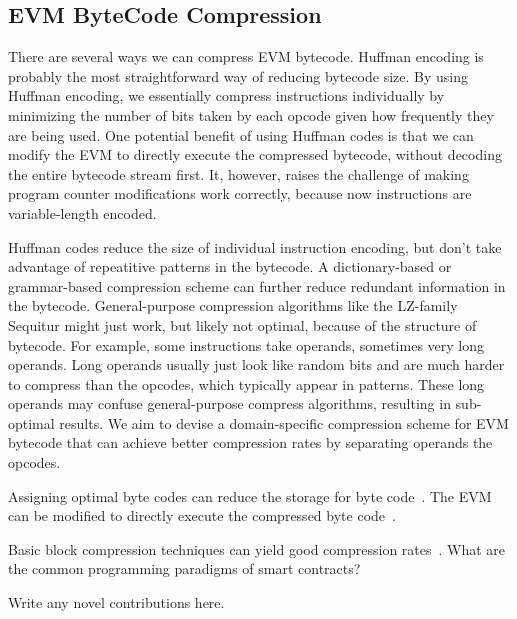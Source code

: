 
\subsection{EVM ByteCode Compression}\label{sec:evmcompress}

There are several ways we can compress EVM bytecode. Huffman encoding is probably the most straightforward
way of reducing bytecode size. By using Huffman encoding, we essentially compress instructions individually
by minimizing the number of bits taken by each opcode given how frequently they are being used. One potential
benefit of using Huffman codes is that we can modify the EVM to directly execute the compressed bytecode,
without decoding the entire bytecode stream first. It, however, raises the challenge of making program counter modifications work
correctly, because now instructions are variable-length encoded.

Huffman codes reduce the size of individual instruction encoding, but don't take advantage of repeatitive patterns in the bytecode.
A dictionary-based or grammar-based compression scheme can further reduce redundant information in the bytecode.
General-purpose compression algorithms like the LZ-family Sequitur might just work,
but likely not optimal, because of the structure of bytecode.
For example, some instructions take operands, sometimes very long operands.
Long operands usually just look like random bits and are much harder to compress than the opcodes, which typically appear in patterns.
These long operands may confuse general-purpose compress algorithms, resulting in sub-optimal results.
We aim to devise a domain-specific compression scheme for EVM bytecode that can achieve better compression rates
by separating operands the opcodes.

Assigning optimal byte codes can reduce the storage for byte code~\cite{aslam2010}.
The EVM can be modified to directly execute the compressed byte code~\cite{marc2003,evans2003}.

Basic block compression techniques can yield good compression rates~\cite{clausen2000}. 
What are the common programming paradigms of smart contracts?

Write any novel contributions here.

